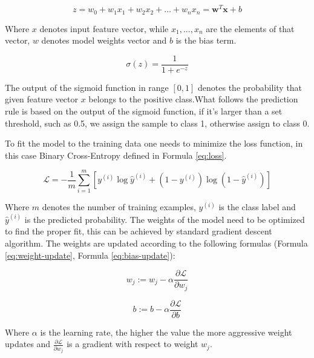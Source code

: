 \documentclass[12pt]{article}
\begin{document}
\begin{equation}\label{eq:logreg}
    z = w_0 + w_1 x_1 + w_2 x_2 + \dots + w_n x_n = \mathbf{w}^T \mathbf{x} + b    
\end{equation}


Where $x$ denotes input feature vector, while $x_1,...,x_n$ are the elements of that vector, $w$ denotes model weights vector and $b$ is the bias term.  



\begin{equation}\label{eq:sigmoid}
    \sigma(z) = \frac{1}{1 + e^{-z}}
\end{equation}

The output of the sigmoid function in range $[0,1]$ denotes the probability that given feature vector $x$ belongs to the positive class.What follows the prediction rule is based on the output of the sigmoid function, if it's larger than a set threshold, such as 0.5, we assign the sample to class 1, otherwise assign to class 0.

To fit the model to the training data one needs to minimize the loss function, in this case Binary Cross-Entropy defined in Formula \ref{eq:loss}.

\begin{equation}\label{eq:loss}
    \mathcal{L} = -\frac{1}{m} \sum_{i=1}^{m} \left[ y^{(i)} \log \hat{y}^{(i)} + \left(1 - y^{(i)}\right) \log \left(1 - \hat{y}^{(i)}\right) \right]
\end{equation}


Where $m$ denotes the number of training examples, $y^{(i)}$ is the class label and $\hat{y}^{(i)}$ is the predicted probability. The weights of the model need to be optimized to find the proper fit, this can be achieved by standard gradient descent algorithm. The weights are updated according to the following formulas (Formula \ref{eq:weight-update}, Formula \ref{eq:bias-update}):


\begin{equation}\label{eq:weight-update}
    w_j := w_j - \alpha \frac{\partial \mathcal{L}}{\partial w_j}
\end{equation}

\begin{equation}\label{eq:bias-update}
    b := b - \alpha \frac{\partial \mathcal{L}}{\partial b}
\end{equation}

Where $\alpha$ is the learning rate, the higher the value the more aggressive weight updates and $\frac{\partial \mathcal{L}}{\partial w_j}$ is a gradient with respect to weight $w_j$.
\end{document}
